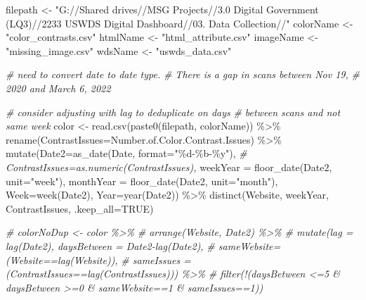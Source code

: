 \documentclass[
]{article}
\newenvironment{Shaded}{\begin{snugshade}}{\end{snugshade}}
\newcommand{\AttributeTok}[1]{\textcolor[rgb]{0.77,0.63,0.00}{#1}}
\newcommand{\CommentTok}[1]{\textcolor[rgb]{0.56,0.35,0.01}{\textit{#1}}}
\newcommand{\ConstantTok}[1]{\textcolor[rgb]{0.00,0.00,0.00}{#1}}
\newcommand{\FunctionTok}[1]{\textcolor[rgb]{0.00,0.00,0.00}{#1}}
\newcommand{\NormalTok}[1]{#1}
\newcommand{\OtherTok}[1]{\textcolor[rgb]{0.56,0.35,0.01}{#1}}
\newcommand{\SpecialCharTok}[1]{\textcolor[rgb]{0.00,0.00,0.00}{#1}}
\newcommand{\StringTok}[1]{\textcolor[rgb]{0.31,0.60,0.02}{#1}}
\begin{document}
\begin{Shaded}
\begin{Highlighting}[]
\NormalTok{filepath }\OtherTok{\textless{}{-}} \StringTok{"G://Shared drives//MSG Projects//3.0 Digital Government (LQ3)//2233 USWDS Digital Dashboard//03. Data Collection//"}
\NormalTok{colorName }\OtherTok{\textless{}{-}} \StringTok{"color\_contrasts.csv"}
\NormalTok{htmlName }\OtherTok{\textless{}{-}} \StringTok{"html\_attribute.csv"}
\NormalTok{imageName }\OtherTok{\textless{}{-}} \StringTok{"missing\_image.csv"}
\NormalTok{wdsName }\OtherTok{\textless{}{-}} \StringTok{"uswds\_data.csv"}

\CommentTok{\# need to convert date to date type. }
\CommentTok{\# There is a gap in scans between Nov 19,}
\CommentTok{\# 2020 and March 6, 2022}

\CommentTok{\# consider adjusting with lag to deduplicate on days}
\CommentTok{\# between scans and not same week}
\NormalTok{color }\OtherTok{\textless{}{-}} \FunctionTok{read.csv}\NormalTok{(}\FunctionTok{paste0}\NormalTok{(filepath, colorName)) }\SpecialCharTok{\%\textgreater{}\%}
  \FunctionTok{rename}\NormalTok{(}\AttributeTok{ContrastIssues=}\NormalTok{Number.of.Color.Contrast.Issues) }\SpecialCharTok{\%\textgreater{}\%}
  \FunctionTok{mutate}\NormalTok{(}\AttributeTok{Date2=}\FunctionTok{as\_date}\NormalTok{(Date, }\AttributeTok{format=}\StringTok{"\%d{-}\%b{-}\%y"}\NormalTok{),}
    \CommentTok{\# ContrastIssues=as.numeric(ContrastIssues),}
    \AttributeTok{weekYear =} \FunctionTok{floor\_date}\NormalTok{(Date2, }\AttributeTok{unit=}\StringTok{"week"}\NormalTok{),}
    \AttributeTok{monthYear =} \FunctionTok{floor\_date}\NormalTok{(Date2, }\AttributeTok{unit=}\StringTok{"month"}\NormalTok{),}
    \AttributeTok{Week=}\FunctionTok{week}\NormalTok{(Date2),}
    \AttributeTok{Year=}\FunctionTok{year}\NormalTok{(Date2)) }\SpecialCharTok{\%\textgreater{}\%}
  \FunctionTok{distinct}\NormalTok{(Website, weekYear, ContrastIssues, }\AttributeTok{.keep\_all=}\ConstantTok{TRUE}\NormalTok{)}


\CommentTok{\# colorNoDup \textless{}{-} color \%\textgreater{}\%}
\CommentTok{\#   arrange(Website, Date2) \%\textgreater{}\%}
\CommentTok{\#   mutate(lag = lag(Date2), daysBetween = Date2{-}lag(Date2),}
\CommentTok{\#          sameWebsite= (Website==lag(Website)),}
\CommentTok{\#          sameIssues = (ContrastIssues==lag(ContrastIssues))) \%\textgreater{}\%}
\CommentTok{\#   filter(!(daysBetween \textless{}=5 \& daysBetween \textgreater{}=0 \& sameWebsite==1 \& sameIssues==1))}


\end{Highlighting}
\end{Shaded}
\end{document}
